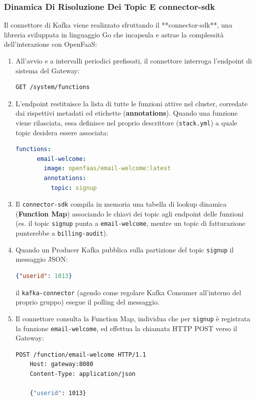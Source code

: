 \documentclass[11pt, a4paper]{article}
\begin{document}
\subsubsection{Dinamica Di Risoluzione Dei Topic E connector-sdk}
Il connettore di Kafka viene realizzato sfruttando il **connector-sdk**, una libreria sviluppata in linguaggio Go che incapsula e astrae la complessità dell'interazione con OpenFaaS:
\begin{enumerate}
    \item All'avvio e a intervalli periodici prefissati, il connettore interroga l'endpoint di sistema del Gateway:
    \begin{lstlisting}[language=bash]
    GET /system/functions
    \end{lstlisting}
    \item L'endpoint restituisce la lista di tutte le funzioni attive nel cluster, corredate dai rispettivi metadati ed etichette (\textbf{annotations}). Quando una funzione viene rilasciata, essa definisce nel proprio descrittore (\texttt{stack.yml}) a quale topic desidera essere associata:
    \begin{lstlisting}[language=yaml]
    functions:
      email-welcome:
        image: openfaas/email-welcome:latest
        annotations:
          topic: signup
    \end{lstlisting}
    \item Il \texttt{connector-sdk} compila in memoria una tabella di lookup dinamica (\textbf{Function Map}) associando le chiavi dei topic agli endpoint delle funzioni (es. il topic \texttt{signup} punta a \texttt{email-welcome}, mentre un topic di fatturazione punterebbe a \texttt{billing-audit}).
    \item Quando un Producer Kafka pubblica sulla partizione del topic \texttt{signup} il messaggio JSON:
    \begin{lstlisting}[language=json]
    {"userid": 1013}
    \end{lstlisting}
    il \texttt{kafka-connector} (agendo come regolare Kafka Consumer all'interno del proprio gruppo) esegue il polling del messaggio.
    \item Il connettore consulta la Function Map, individua che per \texttt{signup} è registrata la funzione \texttt{email-welcome}, ed effettua la chiamata HTTP POST verso il Gateway:
    \begin{lstlisting}[language=bash]
    POST /function/email-welcome HTTP/1.1
    Host: gateway:8080
    Content-Type: application/json

    {"userid": 1013}
    \end{lstlisting}
\end{enumerate}
\end{document}
